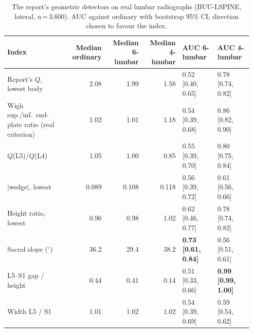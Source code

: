 \documentclass[11pt,letterpaper]{article}
\newcommand{\ci}[2]{[#1, #2]}
\begin{document}
\begin{table}[h]\centering\small
\caption{The report's geometric detectors on real lumbar radiographs (BUU-LSPINE, lateral, n\,=\,3,600). AUC against ordinary with bootstrap 95\% CI; direction chosen to favour the index.}
\begin{tabular}{lrrrll}\toprule
Index & Median ordinary & Median 6-lumbar & Median 4-lumbar & AUC 6-lumbar & AUC 4-lumbar \\ \midrule
Report's $Q$, lowest body & 2.08 & 1.99 & 1.58 & 0.52 \ci{0.40}{0.65} & 0.78 \ci{0.74}{0.82} \\
Wigh sup./inf.\ end-plate ratio (real criterion) & 1.02 & 1.01 & 1.18 & 0.54 \ci{0.39}{0.68} & 0.86 \ci{0.82}{0.90} \\
$Q$(L5)/$Q$(L4) & 1.05 & 1.00 & 0.85 & 0.55 \ci{0.39}{0.70} & 0.80 \ci{0.75}{0.84} \\
$|$wedge$|$, lowest & 0.089 & 0.108 & 0.118 & 0.56 \ci{0.39}{0.72} & 0.61 \ci{0.56}{0.66} \\
Height ratio, lowest & 0.96 & 0.98 & 1.02 & 0.62 \ci{0.46}{0.77} & 0.78 \ci{0.74}{0.82} \\
Sacral slope ($^\circ$) & 36.2 & 29.4 & 38.2 & \textbf{0.73 \ci{0.61}{0.84}} & 0.56 \ci{0.51}{0.61} \\
L5--S1 gap / height & 0.44 & 0.41 & 0.14 & 0.51 \ci{0.33}{0.66} & \textbf{0.99 \ci{0.99}{1.00}} \\
Width L5 / S1 & 1.01 & 1.02 & 1.02 & 0.54 \ci{0.39}{0.69} & 0.59 \ci{0.54}{0.62} \\ \bottomrule
\end{tabular}
\end{table}
\end{document}
